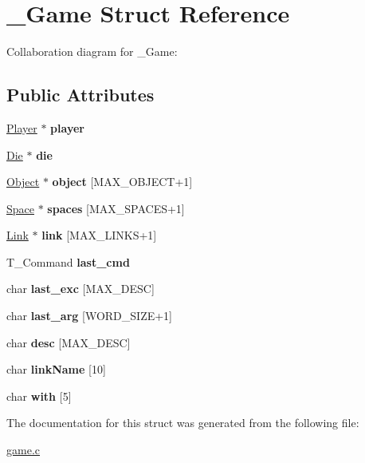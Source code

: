 \hypertarget{struct__Game}{}\section{\+\_\+\+Game Struct Reference}
\label{struct__Game}


Collaboration diagram for \+\_\+\+Game\+:
\subsection*{Public Attributes}
\begin{DoxyCompactItemize}
\item 
\mbox{\label{struct__Game_a31406605782d71ec00c4bf258ea76267}} 
\hyperlink{struct__Player}{Player} $\ast$ {\bfseries player}
\item 
\mbox{\label{struct__Game_a0d6009b5dcb080489c192a9198fa7d46}} 
\hyperlink{struct__Die}{Die} $\ast$ {\bfseries die}
\item 
\mbox{\label{struct__Game_aefbd7a4e05a78ee0c110fd5582b3a23a}} 
\hyperlink{struct__Object}{Object} $\ast$ {\bfseries object} \mbox{[}M\+A\+X\+\_\+\+O\+B\+J\+E\+CT+1\mbox{]}
\item 
\mbox{\label{struct__Game_ab4180417d9148f8abb2233ca6c4ecfe5}} 
\hyperlink{struct__Space}{Space} $\ast$ {\bfseries spaces} \mbox{[}M\+A\+X\+\_\+\+S\+P\+A\+C\+ES+1\mbox{]}
\item 
\mbox{\label{struct__Game_ac0b7120da2aad265b1c9ca894ce31413}} 
\hyperlink{struct__Link}{Link} $\ast$ {\bfseries link} \mbox{[}M\+A\+X\+\_\+\+L\+I\+N\+KS+1\mbox{]}
\item 
\mbox{\label{struct__Game_a27727b50ea0904a1fe9e1c55c27f2cf1}} 
T\+\_\+\+Command {\bfseries last\+\_\+cmd}
\item 
\mbox{\label{struct__Game_a25eef06c0e547fc9917ed10f1f2d098d}} 
char {\bfseries last\+\_\+exc} \mbox{[}M\+A\+X\+\_\+\+D\+E\+SC\mbox{]}
\item 
\mbox{\label{struct__Game_a0424c8ef8f0835cb369e91c35807ace4}} 
char {\bfseries last\+\_\+arg} \mbox{[}W\+O\+R\+D\+\_\+\+S\+I\+ZE+1\mbox{]}
\item 
\mbox{\label{struct__Game_a3ddcb6ed9322202b6f6345a710fd5cd3}} 
char {\bfseries desc} \mbox{[}M\+A\+X\+\_\+\+D\+E\+SC\mbox{]}
\item 
\mbox{\label{struct__Game_a4285d65e72a3555d8366c036ad2e5ebe}} 
char {\bfseries link\+Name} \mbox{[}10\mbox{]}
\item 
\mbox{\label{struct__Game_aee9e1b3242bb06635435b8e6709968e4}} 
char {\bfseries with} \mbox{[}5\mbox{]}
\end{DoxyCompactItemize}


The documentation for this struct was generated from the following file\+:\begin{DoxyCompactItemize}
\item 
\hyperlink{game_8c}{game.\+c}\end{DoxyCompactItemize}
